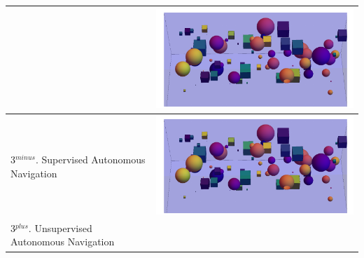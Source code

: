 \begin{table}[h!]
\begin{tabular}{ | m{6cm} | m{6cm} | }
      &
      \begin{minipage}{.3\textwidth}
      \includegraphics[width=\linewidth]{figures/table1_1.pdf}
    \end{minipage}
    \\  \hline
      3$^{minus}$. Supervised  Autonomous  Navigation  
    
      &
      \begin{minipage}{.3\textwidth}
      \includegraphics[width=\linewidth]{figures/table1_1.pdf}
    \end{minipage}
    \\  \hline
      3$^{plus}$. Unsupervised Autonomous Navigation 
   

\end{tabular}
\end{table}
